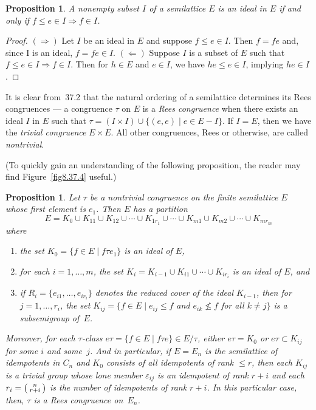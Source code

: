 \documentclass{surv-l}
\numberwithin{equation}{section}
\numberwithin{table}{section}
\numberwithin{figure}{section}
\theoremstyle{plain}
\newtheorem{proposition}[equation]{Proposition}
\theoremstyle{definition}
\begin{document}
\setcounter{equation}{1}
\begin{proposition}\label{prop8.37.2}
A nonempty subset $I$ of a semilattice $E$ is an ideal in $E$ if
and only if $f\leq e\in I \Rightarrow f\in I$.
\end{proposition}

\begin{proof}
$(\Rightarrow)$ Let $I$ be an ideal in $E$ and suppose $f\leq e\in
I$. Then $f=fe$ and, since I is an ideal, $ f=fe\in I$.
$(\Leftarrow)$ Suppose $I$ is a subset of $E$ such that $f\leq
e\in I \Rightarrow f\in I$. Then for $h\in E$ and $e\in I$, we
have $he\leq e\in I$, implying $he\in I$.
\end{proof}

It is clear from~37.2 that the natural ordering of a semilattice
determines its Rees congruences --- a congruence $\tau$ on $E$ is
a \emph{Rees congruence} when there exists
an ideal $I$ in $E$ such that $\tau= (I\times I) \cup\{(e,
e)\mid e\in E-I\}$. If $I =E$, then we have the \emph{trivial
congruence} $E\times E$. All other
congruences, Rees or otherwise, are called
\emph{nontrivial}.

(To quickly gain an understanding of the following proposition,
the reader may find Figure~\ref{fig8.37.4} useful.)

\begin{proposition}\label{prop8.37.3}
Let $\tau$ be a nontrivial congruence on the finite semilattice
$E$ whose first element is $e_{1}$. Then $E$ has a partition
\[
E=K_{0}\cup K_{11}\cup K_{12}\cup\cdots\cup
K_{1r_{1}}\cup\cdots\cup K_{m1}\cup K_{m2}\cup\cdots\cup
K_{mr_{m}}
\]
where
\begin{enumerate}
\item[(1)] the set $K_{0}=\{f\in E\mid f\tau e_{1}\}$ is an ideal of $E$,

\item[(2)] for each $i=1,\ldots, m$, the set
$K_{i}=K_{i-1}\cup K_{i1}\cup\cdots\cup K_{ir_{i}}$ is an
ideal of $E$, and

\item[(3)] if $R_{i}=\{e_{i1},\ldots, e_{ir_{i}}\}$ denotes
the reduced cover of the ideal $K_{i-1}$, then for
$j=1,\ldots, r_{i}$, the set $K_{ij}=\{f\in
E\mid e_{ij}\leq f$ and $e_{ik}\not\leq f$ for all $k\neq
j\}$ is a subsemigroup of~$E$.
\end{enumerate}
Moreover, for each $\tau$-class $e\tau=\{f\in E\mid f\tau
e\}\in E/\tau$, either $e\tau=K_{0}$ or $e\tau\subset K_{ij}$ for
some $i$ and some~$j$. And in particular, if $E=E_{n}$ is the
semilattice of idempotents in $C_{n}$ and $K_{0}$ consists of all
idempotents of rank $\leq r$, then each $K_{ij}$ is a trivial
group whose lone member $\varepsilon_{ij}$ is an idempotent of
rank $r+i$ and each $r_{i}=\big(\kern0.5pt\begin{smallmatrix}
n\\
r+i\end{smallmatrix}\kern0.5pt\big)$ is the number of idempotents of rank
$r+i$. In this particular case, then, $\tau$ is a Rees congruence
on~$E_{n}$.
\end{proposition}
\end{document}
